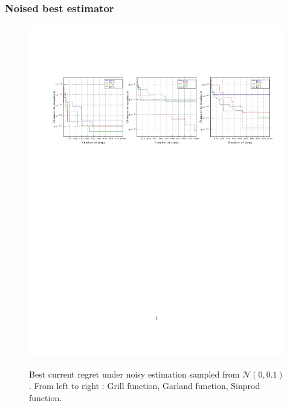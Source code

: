 \documentclass[xcolor={usenames,dvipsnames}]{beamer}
\begin{document}
\begin{frame}
\frametitle{Noised best estimator}
\begin{figure}
\includegraphics[trim={2cm 6cm 1cm 4cm},clip,scale = 0.66]{best1000_01.pdf}\\
\vspace*{-8cm}
 \caption{\label{fig:noise01}Best current regret under noisy estimation sampled from $\mathcal{N}(0,0.1)$ . From left to right : Grill function, Garland function, Sinprod function.}
\end{figure}
\end{frame}
\end{document}
